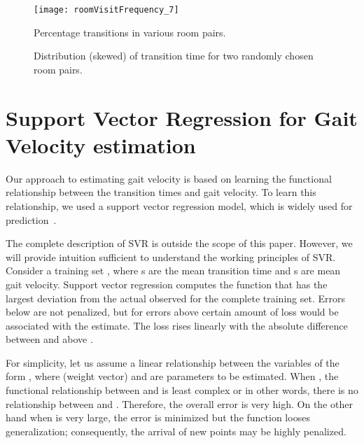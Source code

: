 \documentclass[journal]{IEEEtran}
\begin{document}
\begin{figure}
\centering
\texttt{[image: roomVisitFrequency\_7]}
\caption{Percentage transitions in various room pairs.}
\label{fig:roomVisitFrequency}
\end{figure}


\begin{figure}[ht]
\centering
{}
\caption{Distribution (skewed) of transition time for two randomly chosen room pairs.}
\label{fig:skewedDistribution}
\end{figure}

\section{Support Vector Regression for Gait Velocity estimation}
\label{subsec:svr}



Our approach to estimating gait velocity is based on learning the functional relationship between the transition times and gait velocity.  To learn this relationship, we used a support vector regression model, which is widely used for prediction~\cite{rana2013feasibility,rana2011adaptive}.

The complete description of SVR is outside the scope of this paper. However, we will provide intuition sufficient to understand the working principles of SVR. Consider a training set , where s are the mean transition time and s are mean gait velocity. Support vector regression computes the function  that has the largest  deviation from the actual observed  for the complete training set.
Errors below  are not penalized, but for errors above  certain amount of loss would be associated with the estimate. The loss rises linearly with the absolute difference between  and  above .



For simplicity, let us assume a linear relationship between the variables of the form , where  (weight vector) and  are parameters to be estimated. 
When , the functional relationship between  and  is least complex or in other words, there is no relationship between  and . Therefore, the overall error is very high. On the other hand when  is very large, the error is minimized but the function  looses generalization; consequently, the arrival of new points may be highly penalized. 
\end{document}
